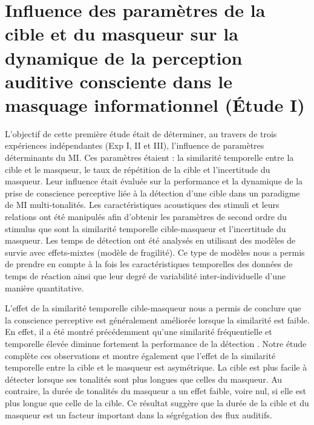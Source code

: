 \section[Influence des paramètres de la cible et du masqueur (Étude I)]{Influence des paramètres de la cible et du masqueur sur la dynamique de la perception auditive consciente dans le masquage informationnel (Étude I)}

L'objectif de cette première étude était de déterminer, au travers de trois expériences indépendantes (Exp I, II et III), l'influence de paramètres déterminants du MI.
Ces paramètres étaient : la similarité temporelle entre la cible et le masqueur, le taux de répétition de la cible et l'incertitude du masqueur.
Leur influence était évaluée sur la performance et la dynamique de la prise de conscience perceptive liée à la détection d'une cible dans un paradigme de MI multi-tonalités. 
Les caractéristiques acoustiques des stimuli et leurs relations ont été manipulés afin d'obtenir les paramètres de second ordre du stimulus que sont la similarité temporelle cible-masqueur et l'incertitude du masqueur. 
Les temps de détection ont été analysés en utilisant des modèles de survie avec effets-mixtes (modèle de fragilité). 
Ce type de modèles nous a permis de prendre en compte à la fois les caractéristiques temporelles des données de temps de réaction ainsi que leur degré de variabilité inter-individuelle d'une manière quantitative. 

L'effet de la similarité temporelle cible-masqueur nous a permis de conclure que la conscience perceptive est généralement améliorée lorsque la similarité est faible. 
En effet, il a été montré précédemment qu'une similarité fréquentielle et temporelle élevée diminue fortement la performance de la détection \citep{durlach2003informational, kidd2002similarity}. 
Notre étude complète ces observations et montre également que l'effet de la similarité temporelle entre la cible et le masqueur est asymétrique. 
La cible est plus facile à détecter lorsque ses tonalités sont plus longues que celles du masqueur. 
Au contraire, la durée de tonalités du masqueur a un effet faible, voire nul, si elle est plus longue que celle de la cible. 
Ce résultat suggère que la durée de la cible et du masqueur est un facteur important dans la ségrégation des flux auditifs. 

